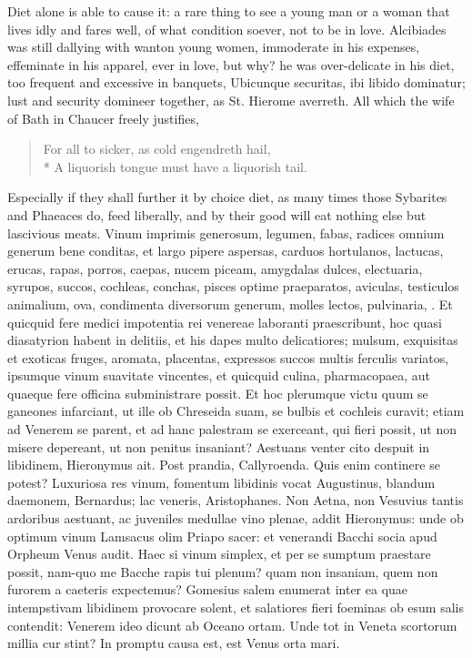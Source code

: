 {Diet alone is able to cause it: a rare thing to see a young man or a
woman that lives idly and fares well, of what condition soever, not to
be in love. Alcibiades was still dallying with wanton young
women, immoderate in his expenses, effeminate in his apparel, ever in
love, but why? he was over-delicate in his diet, too frequent and
excessive in banquets, Ubicunque securitas, ibi libido dominatur; lust
and security domineer together, as St. Hierome averreth. All which the
wife of Bath in Chaucer freely justifies,

{\gothfont
\begin{verse}
For all to sicker, as cold engendreth hail,\\*
A liquorish tongue must have a liquorish tail.
\end{verse}
}

Especially if they shall further it by choice diet, as many times those
Sybarites and Phaeaces do, feed liberally, and by their good will eat
nothing else but lascivious meats. Vinum imprimis generosum,
legumen, fabas, radices omnium generum bene conditas, et largo pipere
aspersas, carduos hortulanos, lactucas, erucas, rapas, porros,
caepas, nucem piceam, amygdalas dulces, electuaria, syrupos, succos,
cochleas, conchas, pisces optime praeparatos, aviculas, testiculos
animalium, ova, condimenta diversorum generum, molles lectos,
pulvinaria, \etc{}. Et quicquid fere medici impotentia rei venereae
laboranti praescribunt, hoc quasi diasatyrion habent in delitiis, et
his dapes multo delicatiores; mulsum, exquisitas et exoticas fruges,
aromata, placentas, expressos succos multis ferculis variatos, ipsumque
vinum suavitate vincentes, et quicquid culina, pharmacopaea, aut
quaeque fere officina subministrare possit. Et hoc plerumque victu quum
se ganeones infarciant, ut ille ob Chreseida suam, se bulbis et
cochleis curavit; etiam ad Venerem se parent, et ad hanc palestram se
exerceant, qui fieri possit, ut non misere depereant, ut non
penitus insaniant? Aestuans venter cito despuit in libidinem,
Hieronymus ait. Post prandia, Callyroenda. Quis enim continere se
potest? Luxuriosa res vinum, fomentum libidinis vocat Augustinus,
blandum daemonem, Bernardus; lac veneris, Aristophanes. Non Aetna, non
Vesuvius tantis ardoribus aestuant, ac juveniles medullae vino plenae,
addit Hieronymus: unde ob optimum vinum Lamsacus olim Priapo
sacer: et venerandi Bacchi socia apud  Orpheum Venus audit. Haec
si vinum simplex, et per se sumptum praestare possit, nam-quo me
Bacche rapis tui plenum? quam non insaniam, quem non furorem a caeteris
expectemus? Gomesius salem enumerat inter ea quae intempstivam
libidinem provocare solent, et salatiores fieri foeminas ob esum salis
contendit: Venerem ideo dicunt ab Oceano ortam.
Unde tot in Veneta scortorum millia cur stint?
In promptu causa est, est Venus orta mari.

}
